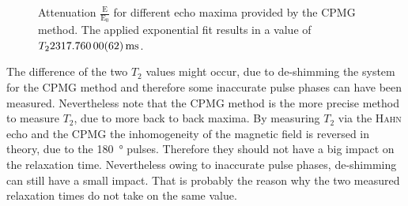 \begin{figure}[H]
    \centering
    
    \caption[Attenuation $\frac{\text{E}}{\text{E}_0}$ for different echo maxima provided by the CPMG method.]{Attenuation $\frac{\text{E}}{\text{E}_0}$ for different echo maxima provided by the CPMG method.
    The applied exponential fit results in a value of $T_2 \SI{2317.76000 \pm 0.00062}{\milli \second}$.}
    \label{fig:CPMG}
\end{figure}

The difference of the two $T_2$ values might occur, due to de-shimming the system for the CPMG method and therefore some inaccurate pulse phases can have been measured.
Nevertheless note that the CPMG method is the more precise method to measure $T_2$, due to more back to back maxima.
By measuring $T_2$ via the \textsc{Hahn} echo and the CPMG the inhomogeneity of the magnetic field is reversed in theory, due to the \SI{180}{\degree} pulses.
Therefore they should not have a big impact on the relaxation time.
Nevertheless owing to inaccurate pulse phases, de-shimming can still have a small impact.
That is probably the reason why the two measured relaxation times do not take on the same value.